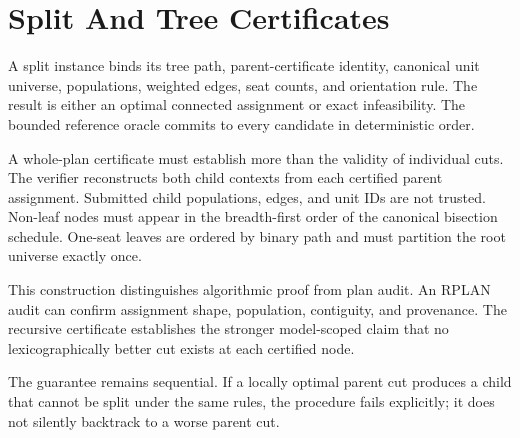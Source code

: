\section{Split And Tree Certificates}

A split instance binds its tree path, parent-certificate identity, canonical
unit universe, populations, weighted edges, seat counts, and orientation rule.
The result is either an optimal connected assignment or exact infeasibility.
The bounded reference oracle commits to every candidate in deterministic order.

A whole-plan certificate must establish more than the validity of individual
cuts. The verifier reconstructs both child contexts from each certified parent
assignment. Submitted child populations, edges, and unit IDs are not trusted.
Non-leaf nodes must appear in the breadth-first order of the canonical
bisection schedule. One-seat leaves are ordered by binary path and must
partition the root universe exactly once.

This construction distinguishes algorithmic proof from plan audit. An RPLAN
audit can confirm assignment shape, population, contiguity, and provenance.
The recursive certificate establishes the stronger model-scoped claim that no
lexicographically better cut exists at each certified node.

The guarantee remains sequential. If a locally optimal parent cut produces a
child that cannot be split under the same rules, the procedure fails
explicitly; it does not silently backtrack to a worse parent cut.
